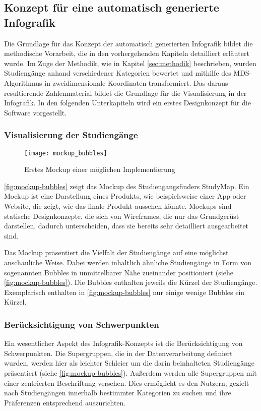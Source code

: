 \subsection{Konzept für eine automatisch generierte Infografik}\label{sec:konzept}
Die Grundlage für das Konzept der automatisch generierten Infografik bildet die methodische Vorarbeit, die in den vorhergehenden Kapiteln detailliert erläutert wurde. Im Zuge der Methodik, wie in Kapitel \ref{sec:methodik} beschrieben, wurden Studiengänge anhand verschiedener Kategorien bewertet und mithilfe des MDS-Algorithmus in zweidimensionale Koordinaten transformiert. Das daraus resultierende Zahlenmaterial bildet die Grundlage für die Visualisierung in der Infografik. In den folgenden Unterkapiteln wird ein erstes Designkonzept für die Software vorgestellt.

\subsubsection{Visualisierung der Studiengänge}

\begin{figure}[H]
    \centering
    \texttt{[image: mockup\_bubbles]}
    \caption{Erstes Mockup einer möglichen Implementierung}
    \label{fig:mockup-bubbles}
\end{figure}

\autoref{fig:mockup-bubbles} zeigt das Mockup des Studiengangsfinders StudyMap. Ein Mockup ist eine Darstellung eines Produkts, wie beispielsweise einer App oder Website, die zeigt, wie das finale Produkt aussehen könnte. Mockups sind statische Designkonzepte, die sich von Wireframes, die nur das Grundgerüst darstellen, dadurch unterscheiden, dass sie bereits sehr detailliert ausgearbeitet sind. \parencite{coursera_staff_what_2023}

Das Mockup präsentiert die Vielfalt der Studiengänge auf eine möglichst anschauliche Weise. Dabei werden inhaltlich ähnliche Studiengänge in Form von sogenannten \glqq Bubbles\grqq{} in unmittelbarer Nähe  zueinander positioniert (siehe \autoref{fig:mockup-bubbles}). Die Bubbles enthalten jeweils die Kürzel der Studiengänge. Exemplarisch enthalten in \autoref{fig:mockup-bubbles} nur einige wenige Bubbles ein Kürzel.

\subsubsection{Berücksichtigung von Schwerpunkten}
Ein wesentlicher Aspekt des Infografik-Konzepts ist die Berücksichtigung von 
Schwerpunkten. Die Supergruppen, die in der Datenverarbeitung definiert wurden, 
werden hier als leichter Schleier um die darin beinhalteten Studiengänge 
präsentiert (siehe \autoref{fig:mockup-bubbles}). Außerdem werden alle
Supergruppen mit einer zentrierten Beschriftung versehen. Dies ermöglicht es den
Nutzern, gezielt nach Studiengängen innerhalb bestimmter Kategorien zu suchen
und ihre Präferenzen entsprechend auszurichten.

